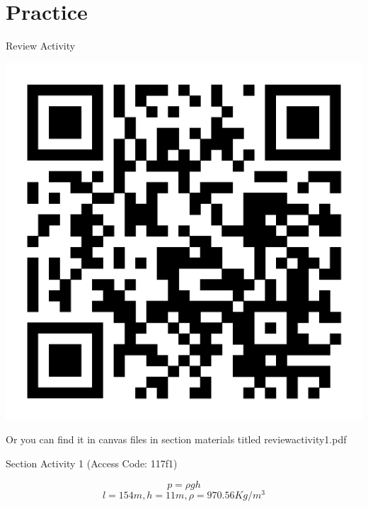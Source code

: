 \documentclass{beamer}
\begin{document}
\section{Practice}
\begin{frame}{Review Activity}

    \includegraphics[width=.6\textwidth]{activity.png}

Or you can find it in canvas files in section materials titled reviewactivity1.pdf    

\end{frame}


\begin{frame}{Section Activity 1 (Access Code: 117f1)}

\[
    p = \rho g h
\]
\[
    l = 154 m, h = 11 m, \rho = 970.56 Kg/m^3
\]
    
\end{frame}
\end{document}
